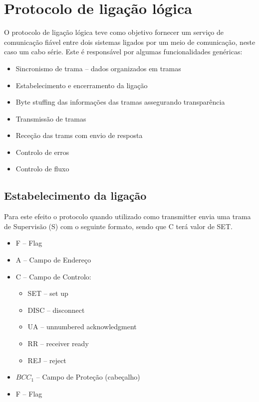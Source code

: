 \documentclass[a4paper,11pt,portuguese]{article}
\begin{document}
\section{Protocolo de ligação lógica}

    O protocolo de ligação lógica teve como objetivo fornecer um serviço de comunicação fiável entre
    dois sistemas ligados por um meio de comunicação, neste caso um cabo série. Este é responsável
    por algumas funcionalidades genéricas:
    \begin{itemize}
        \item Sincronismo de trama -- dados organizados em tramas
        \item Estabelecimento e encerramento da ligação
        \item Byte stuffing das informações das tramas assegurando transparência
        \item Transmissão de tramas
        \item Receção das trams com envio de resposta
        \item Controlo de erros
        \item Controlo de fluxo
    \end{itemize}
    
    \subsection{Estabelecimento da ligação}

    Para este efeito o protocolo quando utilizado como transmitter envia uma trama de Supervisão (S) 
    com o seguinte formato, sendo que C terá valor de SET.

    \begin{itemize}
        \item F -- Flag
        \item A -- Campo de Endereço
        \item C -- Campo de Controlo:
            \begin{itemize}
                \item SET -- set up
                \item DISC -- disconnect
                \item UA -- unnumbered acknowledgment
                \item RR -- receiver ready
                \item REJ -- reject 
            \end{itemize}
        \item $BCC_1$ -- Campo de Proteção (cabeçalho) 
        \item F -- Flag
    \end{itemize}
\end{document}

